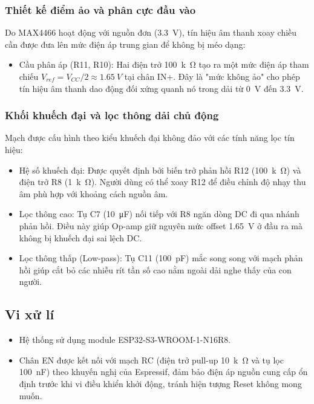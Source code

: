 \documentclass[a4paper]{report}
\begin{document}
\subsubsection{Thiết kế điểm ảo và phân cực đầu vào}
Do MAX4466 hoạt động với nguồn đơn (\qty{3,3}{V}), tín hiệu âm thanh xoay chiều cần được đưa lên mức điện áp trung gian để không bị méo dạng:
\begin{itemize}
    \item Cầu phân áp (R11, R10): Hai điện trở \qty{100}{k\ohm} tạo ra một mức điện áp tham chiếu $V_{ref} = V_{CC}/2 \approx \qty{1,65}{V}$ tại chân IN+. Đây là "mức không ảo" cho phép tín hiệu âm thanh dao động đối xứng quanh nó trong dải từ \qty{0}{V} đến \qty{3,3}{V}.
\end{itemize}

\subsubsection{Khối khuếch đại và lọc thông dải chủ động}
Mạch được cấu hình theo kiểu khuếch đại không đảo với các tính năng lọc tín hiệu:
\begin{itemize}
    \item Hệ số khuếch đại: Được quyết định bởi biến trở phản hồi R12 (\qty{100}{k\ohm}) và điện trở R8 (\qty{1}{k\ohm}). Người dùng có thể xoay R12 để điều chỉnh độ nhạy thu âm phù hợp với khoảng cách nguồn âm.
    \item Lọc thông cao: Tụ C7 (\qty{10}{\micro\farad}) nối tiếp với R8 ngăn dòng DC đi qua nhánh phản hồi. Điều này giúp Op-amp giữ nguyên mức offset \qty{1,65}{V} ở đầu ra mà không bị khuếch đại sai lệch DC.
    \item Lọc thông thấp (Low-pass): Tụ C11 (\qty{100}{pF}) mắc song song với mạch phản hồi giúp cắt bỏ các nhiễu rít tần số cao nằm ngoài dải nghe thấy của con người.
\end{itemize}

\subsection{Vi xử lí}
\begin{itemize}
    \item Hệ thống sử dụng module ESP32-S3-WROOM-1-N16R8. 
    \item Chân EN được kết nối với mạch RC (điện trở pull-up \qty{10}{k\ohm} và tụ lọc \qty{100}{nF}) theo khuyến nghị của Espressif, đảm bảo điện áp nguồn cung cấp ổn định trước khi vi điều khiển khởi động, tránh hiện tượng Reset không mong muốn.
\end{itemize}
\end{document}
